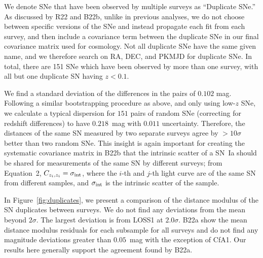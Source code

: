 \documentclass[twocolumn]{aastex63}
\newcommand{\zindex}{z}
\begin{document}
We denote SNe that have been observed by multiple surveys as ``Duplicate SNe.''  As discussed by R22 and B22b, unlike in previous analyses, we do not choose between specific versions of the SNe and instead propagate each fit from each survey, and then include a covariance term between the duplicate SNe in our final covariance matrix used for cosmology.  Not all duplicate SNe have the same given name, and we therefore search on RA, DEC, and PKMJD for duplicate SNe.  In total, there are 151 SNe which have been observed by more than one survey, with all but one duplicate SN having $z<0.1$. 


We find a standard deviation of the differences in the pairs of $0.102$ mag.  Following a similar bootstrapping procedure as above, and only using low-$z$ SNe, we calculate a typical dispersion for $151$ pairs of random SNe (correcting for redshift differences) to have $0.218$~mag with $0.011$ uncertainty.  Therefore, the distances of the same SN measured by two separate surveys agree by $>10\sigma$ better than two random SNe.  This insight is again important for creating the systematic covariance matrix in B22b that the intrinsic scatter of a SN~Ia should be shared for measurements of the same SN by different surveys; from Equation~2, $C_{{\zindex}_i,{\zindex}_i}=\sigma_{\rm int}$, where the $i$-th and $j$-th light curve are of the same SN from different samples, and $\sigma_{\rm int}$ is the intrinsic scatter of the sample.

In Figure~\ref{fig:duplicates}, we present a comparison of the distance modulus of the SN duplicates between surveys.  We do not find any deviations from the mean beyond $2\sigma$.  The largest deviation is from LOSS1 \citep{Ganeshalingam2010} at $2.0\sigma$.  B22a show the mean distance modulus residuals for each subsample for all surveys and do not find any magnitude deviations greater than $0.05$~mag with the exception of CfA1. Our results here generally support the agreement found by B22a. 
\end{document}
